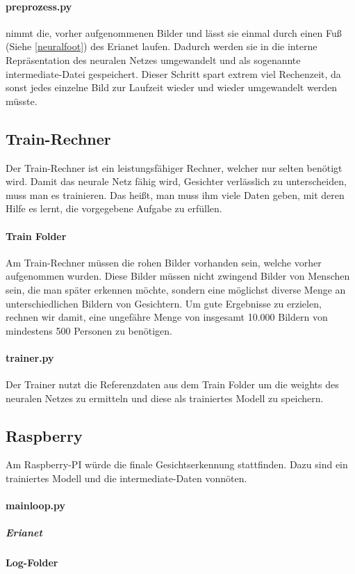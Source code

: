 \documentclass[12pt]{article}
\begin{document}
\paragraph{preprozess.py}
nimmt die, vorher aufgenommenen Bilder und lässt sie einmal 
durch einen Fuß (Siehe \ref{neuralfoot}) des Erianet laufen. Dadurch
werden sie in die interne Repräsentation des neuralen Netzes 
umgewandelt und als sogenannte intermediate-Datei gespeichert.
Dieser Schritt spart extrem viel Rechenzeit, da sonst
jedes einzelne Bild zur Laufzeit wieder und wieder 
umgewandelt werden müsste.
\subsection{Train-Rechner}
Der Train-Rechner ist ein leistungsfähiger Rechner, welcher nur selten
benötigt wird. Damit das neurale Netz fähig wird, Gesichter verlässlich
zu unterscheiden, muss man es trainieren. Das heißt, man muss ihm viele
Daten geben, mit deren Hilfe es lernt, die vorgegebene Aufgabe zu erfüllen.
\paragraph{Train Folder} Am Train-Rechner müssen die rohen
Bilder vorhanden sein, welche vorher aufgenommen wurden.
Diese Bilder müssen nicht zwingend Bilder von Menschen sein,
die man später erkennen möchte, sondern eine möglichst diverse
Menge an unterschiedlichen Bildern von Gesichtern. Um gute Ergebnisse
zu erzielen, rechnen wir damit, eine ungefähre Menge von insgesamt
10.000 Bildern von mindestens 500 Personen zu benötigen.
\paragraph{trainer.py}
Der Trainer nutzt die Referenzdaten aus dem Train Folder 
um die weights des neuralen Netzes zu ermitteln und diese
als trainiertes Modell zu speichern.
\subsection{Raspberry}
Am Raspberry-PI würde die finale Gesichtserkennung stattfinden.
Dazu sind ein trainiertes Modell und die intermediate-Daten vonnöten.
\paragraph{mainloop.py}
\subparagraph{Erianet}
\paragraph{Log-Folder} 
\end{document}
